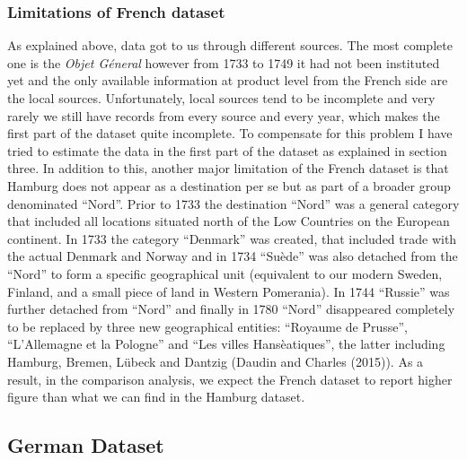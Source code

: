 \documentclass[12pt,a4paper,titlepage,english]{article}
\begin{document}
\subsubsection{Limitations of French dataset}
As explained above, data got to us through different sources. The most complete one is the \textit{Objet Géneral} however from 1733 to 1749 it had not been instituted yet and the only available information at product level from the French side are the local sources. Unfortunately, local sources tend to be incomplete and very rarely we still have records from every source and every year, which makes the first part of the dataset quite incomplete. To compensate for this problem I have tried to estimate the data in the first part of the dataset as explained in section three.
In addition to this, another major limitation of the French dataset is that Hamburg does not appear as a destination per se but as part of a broader group denominated “Nord”. Prior to 1733 the destination “Nord” was a general category that included all locations situated north of the Low Countries on the European continent. In 1733 the category “Denmark” was created, that included trade with the actual Denmark and Norway and in 1734 “Suède” was also detached from the “Nord” to form a specific geographical unit (equivalent to our modern Sweden, Finland, and a small piece of land in Western Pomerania). In 1744 “Russie” was further detached from “Nord” and finally in 1780 “Nord” disappeared completely to be replaced by three new geographical entities: “Royaume de Prusse”, “L’Allemagne et la Pologne” and “Les villes Hansèatiques”, the latter including Hamburg, Bremen, Lübeck and Dantzig (Daudin and Charles (2015)).
As a result, in the comparison analysis, we expect the French dataset to report higher figure than what we can find in the Hamburg dataset. 

\subsection{German Dataset}
\end{document}
